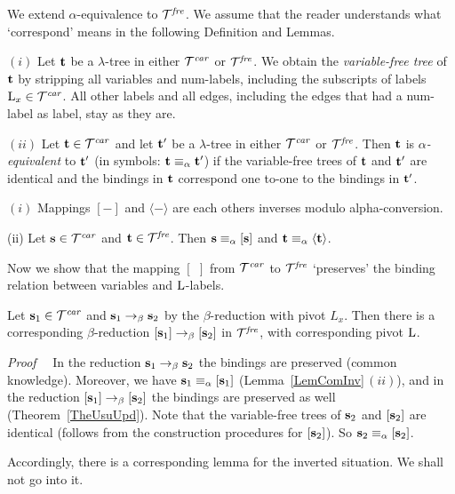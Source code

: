 \documentclass[submission,copyright,creativecommons]{eptcs}
\begin{document}
We extend $\alpha$-equivalence to ${\cal T}^{\it fre}$. We assume that the reader understands what `correspond' means in the following Definition and Lemmas.

\begin{Def}\label{DefComVar}
$(i)$ Let ${\bf t}$ be a $\lambda$-tree in either ${\cal T}^{\it car}$ or ${\cal T}^{\it fre}$. We obtain the {\it variable-free tree\/} of ${\bf t}$ by stripping all variables and num-labels, including the subscripts of labels ${\rm L}_x \in {\cal T}^{\it car}$. All other labels and all edges, including the edges that had a num-label as label, stay as they are.

$(ii)$ Let ${\bf t} \in {\cal T}^{\it car}$ and let ${\bf t}'$ be a $\lambda$-tree in either ${\cal T}^{\it car}$ or ${\cal T}^{\it fre}$. Then ${\bf t}$ is {\em $\alpha$-equivalent\/} to ${\bf t}'$ (in symbols: ${\bf t} \equiv_\alpha {\bf t}'$) if the variable-free trees of ${\bf t}$ and ${\bf t}'$ are identical and the bindings in ${\bf t}$ correspond one to-one to the bindings in ${\bf t}'$.
\end{Def}



\begin{Lem}\label{LemComInv}
 $(i)$ Mappings $[-]$ and $\langle - \rangle$ are each others inverses modulo alpha-conversion.

(ii) Let ${\bf s} \in {\cal T}^{\it car}$ and ${\bf t} \in {\cal T}^{\it fre}$. Then ${\bf s} \equiv_\alpha [{\bf s}]$ and ${\bf t} \equiv_\alpha \langle {\bf t} \rangle$.
\end{Lem}


Now we show that the mapping $[~\,]$ from ${\cal T}^{\it car}$ to ${\cal T}^{\it fre}$ `preserves' the binding relation between variables and ${\rm L}$-labels.

\begin{Lem}\label{LemComIso}
Let ${\bf s}_1 \in {\cal T}^{\it car}$ and ${\bf s}_1 \rightarrow_{\beta} {\bf s}_2$ by the $\beta$-reduction with pivot $L_x$. Then there is a corresponding $\beta$-reduction $[{\bf s}_1] \rightarrow_{\beta} [{\bf s}_2]$ in ${\cal T}^{\it fre}$, with corresponding pivot ${\rm L}$.

{\it  Proof}~~ In the reduction ${\bf s}_1 \rightarrow_{\beta} {\bf s}_2$ the bindings are preserved (common knowledge).
Moreover, we have ${\bf s}_1 \equiv_\alpha [{\bf s}_1]$ (Lemma~\ref{LemComInv}\,$(ii)$), and in the reduction $[{\bf s}_1] \rightarrow_{\beta} [{\bf s}_2]$ the bindings are preserved as well (Theorem~\ref{TheUsuUpd}). Note that the
variable-free trees of ${\bf s}_2$ and $[{\bf s}_2]$ are identical (follows from the construction procedures for $[{\bf s}_2]$). So ${\bf s}_2 \equiv_\alpha [{\bf s}_2]$.
\end{Lem}

Accordingly, there is a corresponding lemma for the inverted situation. We shall not go into it.
\end{document}
